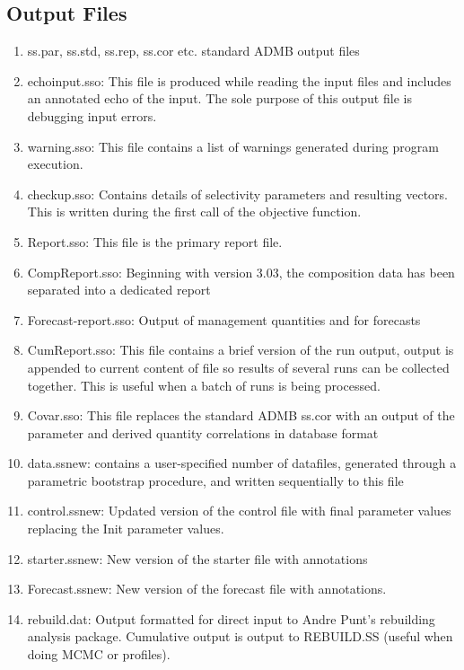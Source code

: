 	\subsection{Output Files}
	\begin{enumerate}
		\item ss.par, ss.std, ss.rep, ss.cor etc.  standard ADMB output files
		\item echoinput.sso:  This file is produced while reading the input files and includes an annotated echo of the input.  The sole purpose of this output file is debugging input errors.
		\item warning.sso:  This file contains a list of warnings generated during program execution.
		\item checkup.sso:  Contains details of selectivity parameters and resulting vectors.  This is written during the first call of the objective function.
		\item Report.sso:  This file is the primary report file.
		\item CompReport.sso:  Beginning with version 3.03, the composition data has been separated into a dedicated report
		\item Forecast-report.sso:  Output of management quantities and for forecasts
		\item CumReport.sso:  This file contains a brief version of the run output, output is appended to current content of file so results of several runs can be collected together.  This is useful when a batch of runs is being processed.
		\item Covar.sso:  This file replaces the standard ADMB ss.cor with an output of the parameter and derived quantity correlations in database format
		\item data.ss\textunderscore new:  contains a user-specified number of datafiles, generated through a parametric bootstrap procedure, and written sequentially to this file
		\item control.ss\textunderscore new:  Updated version of the control file with final parameter values replacing the Init parameter values.
		\item starter.ss\textunderscore new:  New version of the starter file with annotations
		\item Forecast.ss\textunderscore new:  New version of the forecast file with annotations.
		\item rebuild.dat:  Output formatted for direct input to Andre Punt's rebuilding analysis package.  Cumulative output is output to REBUILD.SS (useful when doing MCMC or profiles).
	\end{enumerate}

